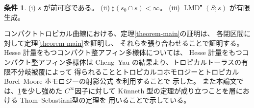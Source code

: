 \documentclass[uplatex,dvipdfmx,12pt]{jsarticle}
\numberwithin{equation}{section}
\theoremstyle{definition}
\newtheorem{condition}[theorem]{条件}
\newcommand{\opn}[1]{\operatorname{#1}}
\newcommand{\aftersection}{\vspace{-8pt}}
\begin{document}
\begin{condition} \label{condition-good}
(i) $s$ が前可容である。
(ii) $\sharp (s_0\cap s)<\infty$。
(iii) $\opn{LMD}^{\bullet}(S;s)$ が有限生成。
\end{condition}


コンパクトトロピカル曲線における、定理\ref{theorem-main}の証明は、
各閉区間に対して定理\ref{theorem-main}を証明し、
それらを張り合わせることで証明する。
Hesse 計量をもつコンパクト整アフィン多様体については、
Hesse 計量をもつコンパクト整アフィン多様体は Cheng--Yau
の結果\cite{MR714338}より、トロピカルトーラスの有限不分岐被覆によって
得られることとトロピカルコホモロジーとトロピカル Borel--Moore
ホモロジーの射影公式
\cite{gross2019sheaftheoretic}を利用することで
示した。
また本論文では、\cref{condition-good}を少し強めた
$C^{\infty}$因子に対して
K\"unneth 型の定理が成り立つことを層における
Thom--Sebastiani型の定理\cite{MR2031639}を
用いることで示している。

\aftersection

{\small


}
\end{document}
